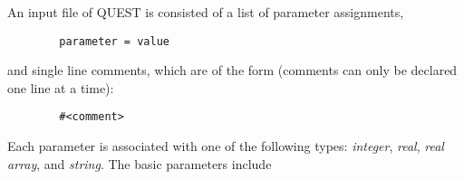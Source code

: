 \documentclass[12pt]{article}
\begin{document}
        An input file of QUEST is consisted of a list of parameter assignments,
        \begin{verbatim}
        parameter = value
        \end{verbatim}
        and single line comments, which are of the form (comments can only be declared one line at a time):
        \begin{verbatim}
        #<comment>
        \end{verbatim}
        Each parameter is associated with one of the following types: \emph{integer}, \emph{real}, \emph{real array}, and \emph{string}.
        The basic parameters include
\end{document}
